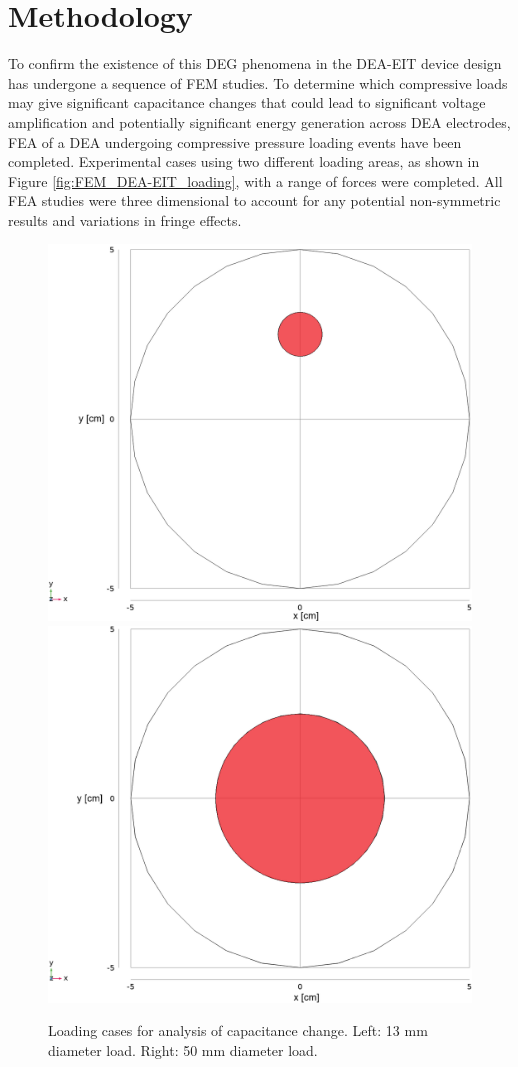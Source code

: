 \section{Methodology} %
\label{sec:method}
To confirm the existence of this DEG phenomena in the DEA-EIT device design has undergone a sequence of FEM studies. To determine which compressive loads may give significant capacitance changes that could lead to significant voltage amplification and potentially significant energy generation across DEA electrodes, FEA of a DEA undergoing compressive pressure loading events have been completed. Experimental cases using two different loading areas, as shown in Figure \ref{fig:FEM_DEA-EIT_loading}, with a range of forces were completed. All FEA studies were three dimensional to account for any potential non-symmetric results and variations in fringe effects.
\begin{figure}[H]
	\centering
	\includegraphics[width=0.45\linewidth]{Figures/d13mm_load_case_comsol2d_red.png} %
	\includegraphics[width=0.45\linewidth]{Figures/d50mm_load_case_comsol2d_red.png} %
	\vspace{0.3cm}
	\caption{Loading cases for analysis of capacitance change. Left: 13 mm diameter load. Right: 50 mm diameter load.}
	\label{fig:DEA-EIT_loading}
\end{figure}


